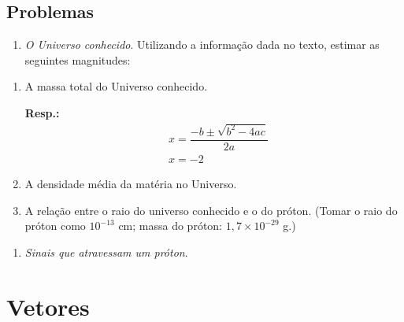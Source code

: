 \documentclass[
]{article}
\providecommand{\tightlist}{%
  \setlength{\itemsep}{0pt}\setlength{\parskip}{0pt}}
\begin{document}
\hypertarget{problemas}{%
\subsection*{Problemas}\label{problemas}}

\begin{enumerate}
\def\labelenumi{\arabic{enumi}.}
\tightlist
\item
  \emph{O Universo conhecido}. Utilizando a informação dada no texto, estimar as seguintes magnitudes:
\end{enumerate}

\begin{enumerate}
\def\labelenumi{\alph{enumi}.}
\item
  A massa total do Universo conhecido.

  \textbf{Resp.:}
  \begin{align*}
     &x = \dfrac{-b \pm \sqrt{b^2 - 4ac}}{2a}\\
     &x = -2
   \end{align*}
\item
  A densidade média da matéria no Universo.
\item
  A relação entre o raio do universo conhecido e o do próton. (Tomar o raio do próton como \(10^{-13}\) cm; massa do próton: \(1,7 \times 10^{-29}\) g.)
\end{enumerate}

\begin{enumerate}
\def\labelenumi{\arabic{enumi}.}
\setcounter{enumi}{1}
\tightlist
\item
  \emph{Sinais que atravessam um próton}.
\end{enumerate}

\hypertarget{vetores}{%
\section{Vetores}\label{vetores}}
\end{document}
